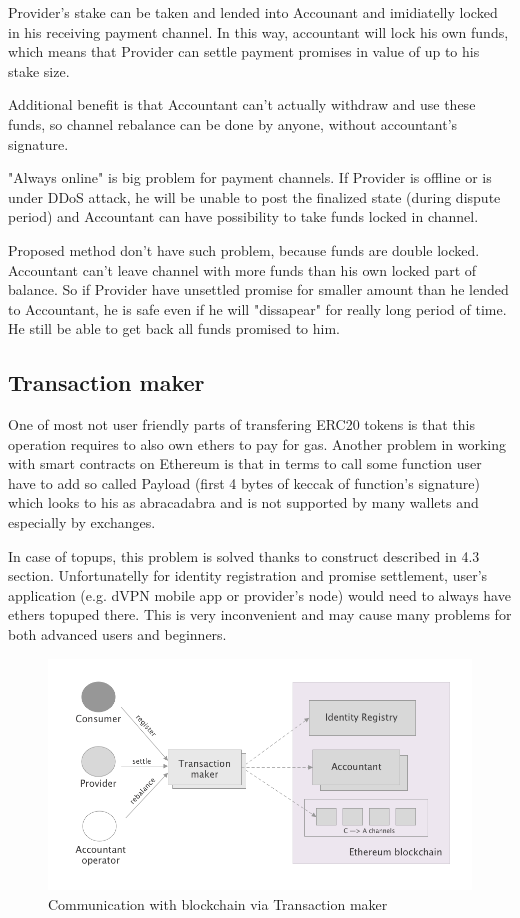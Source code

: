\documentclass[a4paper,12pt]{article}
\begin{document}
Provider's stake can be taken and lended into Accounant and imidiatelly locked 
in his receiving payment channel. In this way, accountant will lock his own 
funds, which means that Provider can settle payment promises in value of up to 
his stake size.

Additional benefit is that Accountant can't actually withdraw and use these 
funds, so channel rebalance can be done by anyone, without accountant's 
signature.

"Always online" is big problem for payment channels. If Provider is offline or 
is under DDoS attack, he will be unable to post the finalized state (during 
dispute period) and Accountant can have possibility to take funds locked in 
channel.

Proposed method don't have such problem, because funds are double locked. 
Accountant can't leave channel with more funds than his own locked part of 
balance. So if Provider have unsettled promise for smaller amount than he 
lended to Accountant, he is safe even if he will "dissapear" for really long 
period of time. He still be able to get back all funds promised to him.

\subsection{Transaction maker}

One of most not user friendly parts of transfering ERC20 tokens is that this
operation requires to also own ethers to pay for gas. Another problem in
working with smart contracts on Ethereum is that in terms to call some function
user have to add so called Payload (first 4 bytes of keccak of function's
signature) which looks to his as abracadabra and is not supported by many 
wallets and especially by exchanges. 

In case of topups, this problem is solved thanks to construct described in 4.3
section. Unfortunatelly for identity registration and promise settlement, user's 
application (e.g. dVPN mobile app or provider's node) would need to always have 
ethers topuped there. This is very inconvenient and may cause many problems for
both advanced users and beginners.

\begin{figure}[H]
    \centering
    \includegraphics[scale=0.5]{../img/transactor}
    \caption{Communication with blockchain via Transaction maker}
    \label{img:transactor}
\end{figure}
\end{document}
